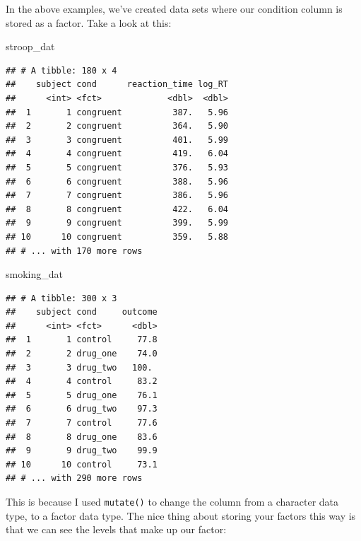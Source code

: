 \documentclass[
]{book}
\newenvironment{Shaded}{\begin{snugshade}}{\end{snugshade}}
\newcommand{\FunctionTok}[1]{\textcolor[rgb]{0.00,0.00,0.00}{#1}}
\newcommand{\NormalTok}[1]{#1}
\newcommand{\SpecialCharTok}[1]{\textcolor[rgb]{0.00,0.00,0.00}{#1}}
\begin{document}
In the above examples, we've created data sets where our condition column is stored as a factor. Take a look at this:

\begin{Shaded}
\begin{Highlighting}[]
\NormalTok{stroop\_dat}
\end{Highlighting}
\end{Shaded}

\begin{verbatim}
## # A tibble: 180 x 4
##    subject cond      reaction_time log_RT
##      <int> <fct>             <dbl>  <dbl>
##  1       1 congruent          387.   5.96
##  2       2 congruent          364.   5.90
##  3       3 congruent          401.   5.99
##  4       4 congruent          419.   6.04
##  5       5 congruent          376.   5.93
##  6       6 congruent          388.   5.96
##  7       7 congruent          386.   5.96
##  8       8 congruent          422.   6.04
##  9       9 congruent          399.   5.99
## 10      10 congruent          359.   5.88
## # ... with 170 more rows
\end{verbatim}

\begin{Shaded}
\begin{Highlighting}[]
\NormalTok{smoking\_dat}
\end{Highlighting}
\end{Shaded}

\begin{verbatim}
## # A tibble: 300 x 3
##    subject cond     outcome
##      <int> <fct>      <dbl>
##  1       1 control     77.8
##  2       2 drug_one    74.0
##  3       3 drug_two   100. 
##  4       4 control     83.2
##  5       5 drug_one    76.1
##  6       6 drug_two    97.3
##  7       7 control     77.6
##  8       8 drug_one    83.6
##  9       9 drug_two    99.9
## 10      10 control     73.1
## # ... with 290 more rows
\end{verbatim}

This is because I used \texttt{mutate()} to change the column from a character data type, to a factor data type. The nice thing about storing your factors this way is that we can see the levels that make up our factor:

\begin{Shaded}
\end{Shaded}
\end{document}
